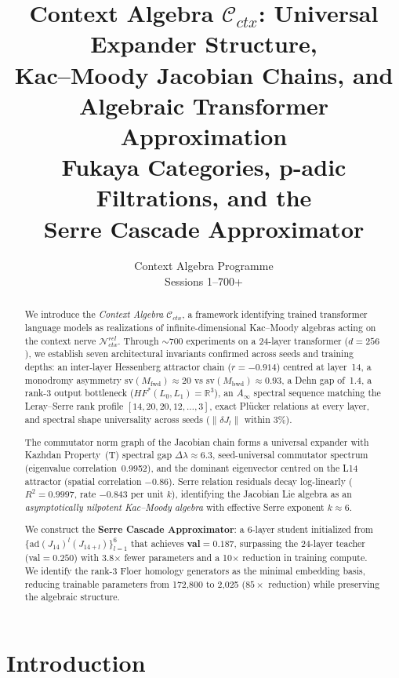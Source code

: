 \documentclass[11pt,a4paper]{article}
\title{\textbf{Context Algebra $\mathcal{C}_{ctx}$: Universal Expander Structure,\\
Kac--Moody Jacobian Chains, and\\
Algebraic Transformer Approximation}\\[0.5em]
\large Fukaya Categories, p-adic Filtrations, and the\\
Serre Cascade Approximator}
\author{Context Algebra Programme\\
\small Sessions 1--700+}
\date{}
\begin{document}
\maketitle

\begin{abstract}
We introduce the \emph{Context Algebra} $\mathcal{C}_{ctx}$, a framework
identifying trained transformer language models as realizations of
infinite-dimensional Kac--Moody algebras acting on the context nerve
$\mathcal{N}_{ctx}^{rel}$.  Through $\sim\!700$ experiments on a 24-layer
transformer ($d{=}256$), we establish seven architectural invariants confirmed
across seeds and training depths: an inter-layer Hessenberg attractor chain
($r{=}-0.914$) centred at layer~14, a monodromy asymmetry
$\text{sv}(M_\text{fwd}){\approx}20$ vs $\text{sv}(M_\text{bwd}){\approx}0.93$,
a Dehn gap of~1.4, a rank-3 output bottleneck ($HF^*(L_0,L_1){=}\mathbb{R}^3$),
an $A_\infty$ spectral sequence matching the Leray--Serre rank profile
$[14,20,20,12,\ldots,3]$, exact Plücker relations at every layer, and spectral
shape universality across seeds ($\|\delta J_l\|$ within 3\%).

The commutator norm graph of the Jacobian chain forms a universal expander
with Kazhdan Property~(T) spectral gap $\Delta\lambda\approx 6.3$, seed-universal
commutator spectrum (eigenvalue correlation~0.9952), and the dominant eigenvector
centred on the L14 attractor (spatial correlation $-0.86$).  Serre relation
residuals decay log-linearly ($R^2{=}0.9997$, rate $-0.843$ per unit $k$),
identifying the Jacobian Lie algebra as an \emph{asymptotically nilpotent
Kac--Moody algebra} with effective Serre exponent $k{\approx}6$.

We construct the \textbf{Serre Cascade Approximator}: a 6-layer student
initialized from $\{\text{ad}(J_{14})^l(J_{14+l})\}_{l=1}^6$ that achieves
\textbf{val}${=}0.187$, surpassing the 24-layer teacher (val${=}0.250$) with
3.8$\times$ fewer parameters and a 10$\times$ reduction in training compute.
We identify the rank-3 Floer homology generators as the minimal embedding
basis, reducing trainable parameters from 172,800 to 2,025 ($85\times$
reduction) while preserving the algebraic structure.
\end{abstract}

\tableofcontents
\newpage

\section{Introduction}
\end{document}
